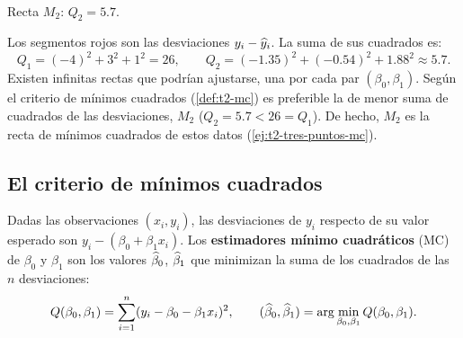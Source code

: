 \begin{ejemplo}
\begin{center}
\begin{minipage}[t]{0.46\linewidth}
\\[2pt]
      {\small Recta $M_2$: $Q_2=5.7$.}
    \end{minipage}
  \end{center}
  Los segmentos rojos son las desviaciones $y_i-\widehat{y}_i$. La suma de sus cuadrados es:
  \[
    Q_1 = (-4)^2+3^2+1^2 = 26,
    \qquad
    Q_2 = (-1.35)^2+(-0.54)^2+1.88^2 \approx 5.7 .
  \]
  Existen infinitas rectas que podrían ajustarse, una por cada par $(\beta_0,\beta_1)$. Según
  el criterio de mínimos cuadrados (\cref{def:t2-mc}) es preferible la de menor suma de
  cuadrados de las desviaciones, $M_2$ ($Q_2=5.7<26=Q_1$). De hecho, $M_2$ es la recta de
  mínimos cuadrados de estos datos (\cref{ej:t2-tres-puntos-mc}).
\end{ejemplo}

\subsection{El criterio de mínimos cuadrados}

\begin{definicion}
  Dadas las observaciones $(x_i,y_i)$, las desviaciones de $y_i$ respecto de su valor esperado
  son $y_i-(\beta_0+\beta_1x_i)$. Los \textbf{estimadores mínimo cuadráticos} (MC) de $\beta_0$
  y $\beta_1$ son los valores $\widehat{\beta}_0$, $\widehat{\beta}_1$ que minimizan la suma de los
  cuadrados de las $n$ desviaciones:
  \[
    Q(\beta_0,\beta_1) = \sum_{i=1}^{n} (y_i-\beta_0-\beta_1x_i)^2,
    \qquad
    (\widehat{\beta}_0,\widehat{\beta}_1) = \arg\min_{\beta_0,\beta_1} Q(\beta_0,\beta_1).
  \]
\end{definicion}

